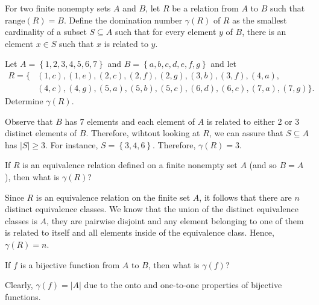 \documentclass[12pt]{article}
\newcommand{\Range}[1]{\mathrm{range}(#1)}
\newenvironment{problem}[2][Problem]{\begin{trivlist} \item[\hskip \labelsep {\bfseries #1}\hskip \labelsep {\bfseries #2.}]}{\end{trivlist}}
\newenvironment{solution}[1][Solution]{\begin{trivlist} \item[\hskip \labelsep {\bfseries #1}]}{\end{trivlist}}
\begin{document}
    \begin{problem}{35}
      For two finite nonempty sets $A$ and $B$, let $R$ be a relation from $A$ to $B$ such that $\Range{R}=B$. Define the domination number $\gamma(R)$ of $R$ as the smallest cardinality of a subset $S\subseteq A$ such that for every element $y$ of $B$, there is an element $x\in S$ such that $x$ is related to $y$.
    \begin{enumerate}
      \item Let $A=\left\{ 1,2,3,4,5,6,7 \right\}$ and $B=\left\{ a,b,c,d,e,f,g \right\}$ and let 
    \begin{align*}
      R= \{ &(1,c),(1,e),(2,c),(2,f),(2,g),(3,b),(3,f),(4,a),\\
      &(4,c),(4,g),(5,a),(5,b),(5,c),(6,d),(6,e),(7,a),(7,g) \}.
    \end{align*}
    Determine $\gamma(R)$. 
    \begin{solution}
      Observe that $B$ has 7 elements and each element of $A$ is related to either 2 or 3 distinct elements of $B$. Therefore, wihtout looking at $R$, we can assure that $S\subseteq A$ has $|S|\geq 3$. For instance, $S=\left\{3,4,6\right\}$. Therefore, $\gamma(R)=3$.
    \end{solution}
      \item If $R$ is an equivalence relation defined on a finite nonempty set $A$ (and so $B=A$), then what is $\gamma(R)$?
    \begin{solution}
      Since $R$ is an equivalence relation on the finite set $A$, it follows that there are $n$ distinct equivalence classes. We know that the union of the distinct equivalence classes is $A$, they are pairwise disjoint and any element belonging to one of them is related to itself and all elements inside of the equivalence class. Hence, $\gamma(R) =n$.
    \end{solution}
      \item If $f$ is a bijective function from $A$ to $B$, then what is $\gamma(f)$?
    \begin{solution}
      Clearly, $\gamma(f) = |A|$ due to the onto and one-to-one properties of bijective functions.
    \end{solution}
    \end{enumerate}
    \end{problem}
\end{document}
